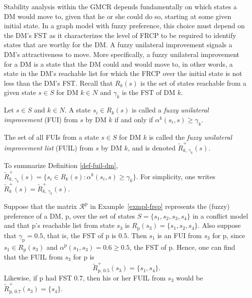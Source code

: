 Stability analysis within the GMCR depends fundamentally on which states a DM would move to, given that he or she could do so, starting at some given initial state. In a graph model with fuzzy preference, this choice must depend on the DM's FST as it characterizes the level of FRCP to be required to identify states that are worthy for the DM. A fuzzy unilateral improvement signals a DM's attractiveness to move. More specifically, a fuzzy unilateral improvement for a DM is a state that the DM could and would move to, in other words, a state in the DM's reachable list for which the FRCP over the initial state is not less than the DM's FST. Recall that $R_k(s)$ is the set of states reachable from a given state $s \in S$ for DM $k \in N$ and $\gamma_k$ is the FST of DM $k$.

\begin{definition}\label{def-fui-dm}
\rm Let $s \in S$ and $k \in N$. A state $s_i \in R_k(s)$ is called a \emph{fuzzy unilateral improvement} (FUI) from $s$ by DM $k$ if and only if $\alpha^k(s_i, s) \geq \gamma_k$.
\end{definition}

\begin{definition}\label{def-fuil-dm}
\rm The set of all FUIs from a state $s \in S$ for DM $k$ is called the \emph{fuzzy unilateral improvement list} (FUIL) from $s$ by DM $k$, and is denoted $\widetilde{R}_{k,\, \gamma_k}^+(s)$.
\end{definition}

\noindent To summarize Definition \ref{def-fuil-dm}, $\widetilde{R}_{k,\, \gamma_k}^+(s)=\{ s_i \in R_k(s) : \alpha^k(s_i, s) \geq \gamma_k \}$. For simplicity, one writes $\widetilde{R}_k^+(s) = \widetilde{R}_{k,\, \gamma_k}^+(s)$.

\begin{example}
\rm Suppose that the matrix $\mathcal{R}^\text{p}$ in Example~\ref{exmpl-frsp} represents the (fuzzy) preference of a DM, p, over the set of states $S=\{s_1, s_2, s_3, s_4\}$ in a conflict model and that p's reachable list from state $s_3$ is $R_\text{p}(s_3)=\{ s_1, s_2, s_4 \}$. Also suppose that $\gamma_\text{p}=0.5$, that is, the FST of p is $0.5$. Then $s_1$ is an FUI from $s_3$ for p, since $s_1 \in R_\text{p}(s_3)$ and $\alpha^{\text{p}}(s_1, s_3)=0.6 \geq 0.5$, the FST of p. Hence, one can find that the FUIL from $s_3$ for p is
$$\widetilde{R}_{\text{p},\, 0.5}^+(s_3)=\{ s_1, s_4 \}.$$
Likewise, if p had FST $0.7$, then his or her FUIL from $s_3$ would be $\widetilde{R}_{\text{p},\, 0.7}^+(s_3)=\{ s_4 \}.$
\end{example}


